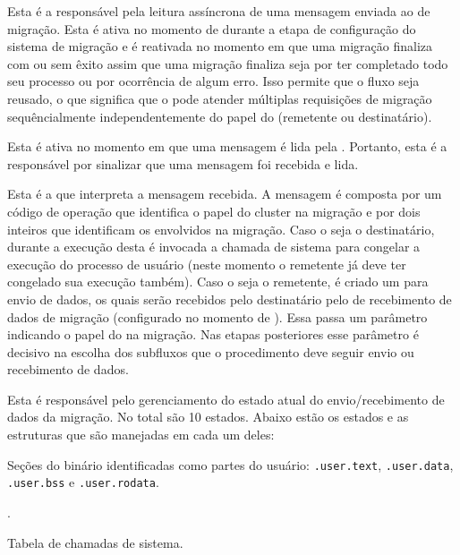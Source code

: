 \begin{description}[leftmargin=*,labelwidth=!,labelindent=0pt]
    \item[1.] Esta é a \task responsável pela leitura assíncrona de uma mensagem enviada ao \daemon de migração. Esta \task é ativa no momento de \boot durante a etapa de configuração do sistema de migração e é reativada no momento em que uma migração finaliza com ou sem êxito \ie assim que uma migração finaliza seja por ter completado todo seu processo ou por ocorrência de algum erro. Isso permite que o fluxo seja reusado, o que significa que o \cluster pode atender múltiplas requisições de migração sequêncialmente independentemente do papel do \cluster (remetente ou destinatário).
    \item[2.] Esta \task é ativa no momento em que uma mensagem é lida pela . Portanto, esta é a \task responsável por sinalizar que uma mensagem foi recebida e lida.
    \item[3.] Esta é a \task que interpreta a mensagem recebida. A mensagem é composta por um código de operação que identifica o papel do cluster na migração e por dois inteiros que identificam os \clusters envolvidos na migração. Caso o \cluster seja o destinatário, durante a execução desta \task é invocada a chamada de sistema \freeze para congelar a execução do processo de usuário (neste momento o \cluster remetente já deve ter congelado sua execução também). Caso o \cluster seja o remetente, é criado um \portal para envio de dados, os quais serão recebidos pelo destinatário pelo \portal {} de recebimento de dados de migração (configurado no momento de \boot). Essa \task passa um parâmetro indicando o papel do \cluster na migração. Nas etapas posteriores esse parâmetro é decisivo na escolha dos subfluxos que o procedimento deve seguir \eg envio ou recebimento de dados.
    \item[4.] Esta \task é responsável pelo gerenciamento do estado atual do envio/recebimento de dados da migração. No total são 10 estados. Abaixo estão os estados e as estruturas que são manejadas em cada um deles:
    \begin{description}[leftmargin=!,labelwidth=\widthof{MSTATE\_FRAMES\_BITMAP \qquad}]
        \item [MSTATE\_SECTIONS] Seções do binário identificadas como partes do usuário: \texttt{.user.text}, \texttt{.user.data}, \texttt{.user.bss} e \texttt{.user.rodata}.
        \item [MSTATE\_UAREA] \uarea.
        \item [MSTATE\_SYSBOARD] Tabela de chamadas de sistema.

\end{description}
\end{description}
